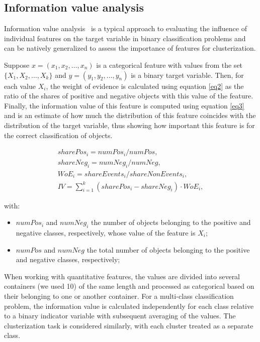 \documentclass[10pt,lettersize,journal]{IEEEtran}
\begin{document}
\subsection{Information value analysis}

Information value analysis~\cite{InformationValue} is a typical approach to evaluating the influence of individual features on the target variable in binary classification problems and can be natively generalized to assess the importance of features for clusterization.

Suppose $x=(x_1, x_2, \ldots, x_n)$ is a categorical feature with values from the set $\{ X_1, X_2, \ldots, X_k \}$ and $y=(y_1, y_2, \ldots, y_n)$ is a binary target variable. Then, for each value $X_i$, the weight of evidence is calculated using equation \eqref{eq2} as the ratio of the shares of positive and negative objects with this value of the feature. Finally, the information value of this feature is computed using equation \eqref{eq3} and is an estimate of how much the distribution of this feature coincides with the distribution of the target variable, thus showing how important this feature is for the correct classification of objects.

\begin{align}
  sharePos_i = numPos_i / numPos, \nonumber\\
  shareNeg_i = numNeg_i / numNeg, \nonumber\\
  WoE_i = shareEvents_i / shareNonEvents_i, \label{eq2}\\
  IV = \sum_{i = 1}^{k} (sharePos_i - shareNeg_i) \cdot WoE_i, \label{eq3}
\end{align}

with:
\begin{itemize}
    \item
        $numPos_i$ and $numNeg_i$ the number of objects belonging to the positive and negative classes, respectively, whose value of the feature is $X_i$;
    \item
        $numPos$ and $numNeg$ the total number of objects belonging to the positive and negative classes, respectively;
\end{itemize}

When working with quantitative features, the values are divided into several containers (we used 10) of the same length and processed as categorical based on their belonging to one or another container. For a multi-class classification problem, the information value is calculated independently for each class relative to a binary indicator variable with subsequent averaging of the values. The clusterization task is considered similarly, with each cluster treated as a separate class.
\end{document}
